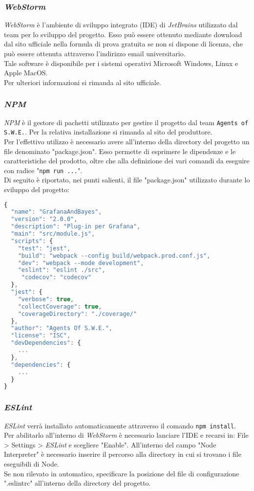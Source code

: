 \subsubsection{\textit{WebStorm}}\label{webstorm}
\textit{WebStorm} è l'ambiente di sviluppo integrato (IDE) di \textit{JetBrains} utilizzato dal team per lo sviluppo del progetto. Esso può essere ottenuto mediante download dal sito ufficiale nella formula di prova gratuita se non si dispone di licenza, che può essere ottenuta attraverso l'indirizzo email universitario.\\
Tale software è disponibile per i sistemi operativi Microsoft Windows, Linux e Apple MacOS.\\
Per ulteriori informazioni si rimanda al sito ufficiale.

\subsubsection{\textit{NPM}}\label{npm}
\textit{NPM} è il gestore di pachetti utilizzato per gestire il progetto dal team \texttt{Agents of S.W.E.}. Per la relativa installazione si rimanda al sito del produttore.\\
Per l'effettivo utilizzo è necessario avere all'interno della directory del progetto un file denominato "package.json". Esso permette di esprimere le dipendenze e le caratteristiche del prodotto, oltre che alla definizione dei vari comandi da eseguire con radice "\texttt{npm run ...}".\\
Di seguito è riportato, nei punti salienti, il file "package.json" utilizzato durante lo sviluppo del progetto:\\
\begin{lstlisting}[language=JavaScript]
{
  "name": "GrafanaAndBayes",
  "version": "2.0.0",
  "description": "Plug-in per Grafana",
  "main": "src/module.js",
  "scripts": {
    "test": "jest",
    "build": "webpack --config build/webpack.prod.conf.js",
    "dev": "webpack --mode development",
    "eslint": "eslint ./src",
     "codecov": "codecov"
  },
  "jest": {
    "verbose": true,
    "collectCoverage": true,
    "coverageDirectory": "./coverage/"
  },
  "author": "Agents Of S.W.E.",
  "license": "ISC",
  "devDependencies": {
    ...
  },
  "dependencies": {
    ...
  }
}
\end{lstlisting}

\subsubsection{\textit{ESLint}}\label{eslint}
\textit{ESLint} verrà installato automaticamente attraverso il comando \texttt{npm install}.\\
Per abilitarlo all'interno di \textit{WebStorm} è necessario lanciare l'IDE e recarsi in: File > Settings > \textit{ESLint} e scegliere "Enable". All'interno del campo "Node Interpreter" è necessario inserire il percorso alla directory in cui si trovano i file eseguibili di Node.\\
Se non rilevato in automatico, specificare la posizione del file di configurazione ".eslintrc" all'interno della directory del progetto.

